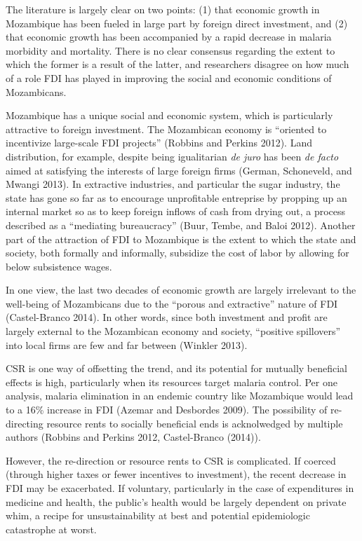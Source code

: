 \documentclass[]{elsarticle} %
\begin{document}
The literature is largely clear on two points: (1) that economic growth
in Mozambique has been fueled in large part by foreign direct
investment, and (2) that economic growth has been accompanied by a rapid
decrease in malaria morbidity and mortality. There is no clear consensus
regarding the extent to which the former is a result of the latter, and
researchers disagree on how much of a role FDI has played in improving
the social and economic conditions of Mozambicans.

Mozambique has a unique social and economic system, which is
particularly attractive to foreign investment. The Mozambican economy is
``oriented to incentivize large-scale FDI projects'' (Robbins and
Perkins 2012). Land distribution, for example, despite being
igualitarian \emph{de juro} has been \emph{de facto} aimed at satisfying
the interests of large foreign firms (German, Schoneveld, and Mwangi
2013). In extractive industries, and particular the sugar industry, the
state has gone so far as to encourage unprofitable entreprise by
propping up an internal market so as to keep foreign inflows of cash
from drying out, a process described as a ``mediating bureaucracy''
(Buur, Tembe, and Baloi 2012). Another part of the attraction of FDI to
Mozambique is the extent to which the state and society, both formally
and informally, subsidize the cost of labor by allowing for below
subsistence wages.

In one view, the last two decades of economic growth are largely
irrelevant to the well-being of Mozambicans due to the ``porous and
extractive'' nature of FDI (Castel-Branco 2014). In other words, since
both investment and profit are largely external to the Mozambican
economy and society, ``positive spillovers'' into local firms are few
and far between (Winkler 2013).

CSR is one way of offsetting the trend, and its potential for mutually
beneficial effects is high, particularly when its resources target
malaria control. Per one analysis, malaria elimination in an endemic
country like Mozambique would lead to a 16\% increase in FDI (Azemar and
Desbordes 2009). The possibility of re-directing resource rents to
socially beneficial ends is acknolwedged by multiple authors (Robbins
and Perkins 2012, Castel-Branco (2014)).

However, the re-direction or resource rents to CSR is complicated. If
coerced (through higher taxes or fewer incentives to investment), the
recent decrease in FDI may be exacerbated. If voluntary, particularly in
the case of expenditures in medicine and health, the public's health
would be largely dependent on private whim, a recipe for
unsustainability at best and potential epidemiologic catastrophe at
worst.
\end{document}
